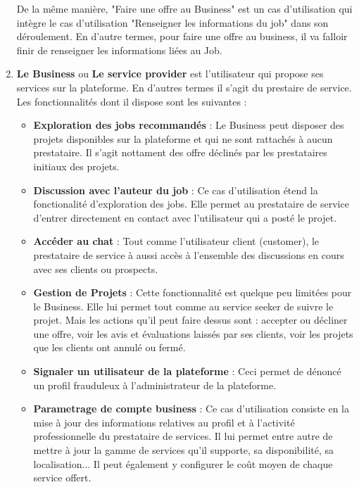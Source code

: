 \begin{enumerate}
    \vspace{0.39cm}
    
    De la même manière, "Faire une offre au Business" est un cas d'utilisation qui intègre le cas d'utilisation "Renseigner les informations du job" dans son déroulement. En d'autre termes, pour faire une offre au business, il va falloir finir de renseigner les informations liées au Job.

    \vspace{1.39cm}
        
    \item \textbf{Le Business} ou \textbf{Le service provider} est l'utilisateur qui propose ses services sur la plateforme. En d'autres termes il s'agit du prestaire de service. Les fonctionnalités dont il dispose sont les suivantes :
    \vspace{0.39cm}
        \begin{itemize}
            \item \textbf{Exploration des jobs recommandés} : Le Business peut disposer des projets disponibles sur la plateforme et qui ne sont rattachés à aucun prestataire. Il s'agit nottament des offre déclinés par les prestataires initiaux des projets.
            \item \textbf{Discussion avec l'auteur du job} : Ce cas d'utilisation étend la fonctionalité d'exploration des jobs. Elle permet au prestataire de service d'entrer directement en contact avec l'utilisateur qui a posté le projet. 
            \item \textbf{Accéder au chat} : Tout comme l'utilisateur client (customer), le prestataire de service à aussi accès à l'ensemble des discussions en cours avec ses clients ou prospects.
            \item \textbf{Gestion de Projets} : Cette fonctionnalité est quelque peu limitées pour le Business. Elle lui permet tout comme au service seeker de suivre le projet. Mais les actions qu'il peut faire dessus sont : accepter ou décliner une offre, voir les avis et évaluations laissés par ses clients, voir les projets que les clients ont annulé ou fermé. 
            \item \textbf{Signaler un utilisateur de la plateforme} : Ceci permet de dénoncé un profil frauduleux à l'administrateur de la plateforme.
            \item \textbf{Parametrage de compte business} : Ce cas d'utilisation consiste en la mise à jour des informations relatives au profil et à l'activité professionnelle du prestataire de services. Il lui permet entre autre de mettre à jour la gamme de services qu'il supporte, sa disponibilité, sa localisation... Il peut également y configurer le coût moyen de chaque service offert.
        \end{itemize}
        

\end{enumerate}
